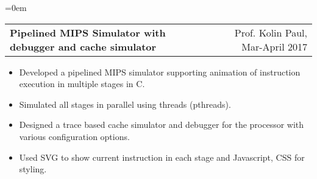 \documentclass{article}
\makeatletter
\newcommand{\headerrow}[2]
{\begin{tabular*}{\linewidth}{l@{\extracolsep{\fill}}r}
	#1 &
	#2 \\
\end{tabular*}}
\makeatother
\begin{document}
\begin{list} {}{\leftmargin=0em}
    \item[]
    \headerrow {\textbf{Pipelined MIPS Simulator with debugger and cache simulator}}{Prof. Kolin Paul, Mar-April 2017}
    \begin{itemize}
    \setlength\itemsep{0.0em}
        \item Developed a pipelined MIPS simulator supporting animation of instruction execution in multiple stages in C.
        \item Simulated all stages in parallel using threads (pthreads).
        \item Designed a trace based cache simulator and debugger for the processor with various configuration options.
        \item Used SVG to show current instruction in each stage and Javascript, CSS for styling.
    \end{itemize}

\end{list}
\end{document}

